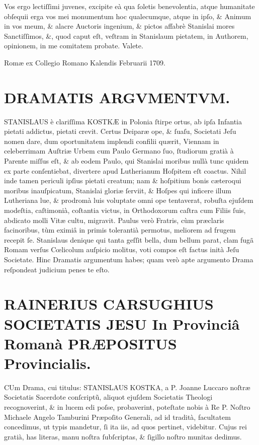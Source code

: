\documentclass[a4paper,12pt]{article}
\begin{document}
Vos ergo lectiſſimi juvenes, excipite eà qua ſoletis benevolentia, atque humanitate obſequii erga vos mei monumentum hoc qualecumque, atque in ipſo, \& Animum in vos meum, \& alacre Auctoris ingenium, \& pictos affabrè Stanislai mores Sanctiſſimos, \&, quod caput eſt, veſtram in Stanislaum pietatem, in Authorem, opinionem, in me comitatem probate. Valete.

Romæ ex Collegio Romano Kalendis Februarii 1709.

\section{DRAMATIS ARGVMENTVM.}
\label{sec:orgc3433ee}

STANISLAUS è clariſſima KOSTKÆ in Polonia ſtirpe ortus, ab ipſa Infantia pietati addictus, pietati crevit. Certus Deiparæ ope, \& ſuaſu, Societati Jeſu nomen dare, dum oportunitatem implendi confilii quærit, Viennam in celeberrimam Auſtriæ Urbem cum Paulo Germano ſuo, ſtudiorum gratià à Parente miſſus eſt, \& ab eodem Paulo, qui Stanislai moribus nullà tunc quidem ex parte conſentiebat, divertere apud Lutherianum Hoſpitem eſt coactus. Nihil inde tamen periculi ipſius pietati creatum; nam \& hoſpitium bonis cæteroqui moribus inauſpicatum, Stanislai gloriæ ſerviit, \& Hoſpes qui inficere illum Lutheriana lue, \& prodromà luis voluptate omni ope tentaverat, robuſta ejuſdem modeſtia, caſtimonià, coſtantia victus, in Orthodoxorum caſtra cum Filiis ſuis, abdicato molli Vitæ cultu, migravit. Paulus verò Fratris, cùm præclaris facinoribus, tùm eximiâ in primis tolerantià permotus, meliorem ad frugem recepit ſe. Stanislaus denique qui tanta geſſit bella, dum bellum parat, clam fugã Romam verſus Cœlicolum auſpicio molitus, voti compos eſt factus inità Jeſu Societate. Hinc Dramatis argumentum habes; quam verò apte argumento Drama reſpondeat judicium penes te eſto.

\section{RAINERIUS CARSUGHIUS SOCIETATIS JESU In Provinciâ Romanà PRÆPOSITUS Provincialis.}
\label{sec:orgc297190}
CUm Drama, cui titulus: STANISLAUS KOSTKA, a P. Joanne Luccaro noſtræ Societatis Sacerdote conſcriptũ,
aliquot ejuſdem Societatis Theologi recognoverint, \& in lucem edi poſse, probaverint, poteſtate nobis à Re P. Noſtro Michaele Angelo Tamburini Præpoſito Generali, ad id tradità, facultatem concedimus, ut typis mandetur, ſi ita iis, ad quos pertinet, videbitur. Cujus rei gratià, has literas, manu noſtra ſubſcriptas, \& ſigillo noſtro munitas dedimus.
\end{document}
